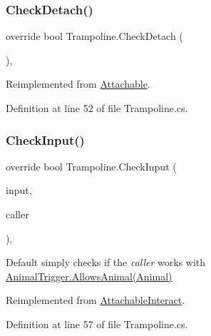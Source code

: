 \subsubsection{\texorpdfstring{Check\+Detach()}{CheckDetach()}}
{\footnotesize\ttfamily override bool Trampoline.\+Check\+Detach (\begin{DoxyParamCaption}{ }\end{DoxyParamCaption})\hspace{0.3cm}{\ttfamily [protected]}, {\ttfamily [virtual]}}



Reimplemented from \mbox{\hyperlink{class_attachable_a5cd6ea1bf16c527c033e6f09681f84f8}{Attachable}}.



Definition at line 52 of file Trampoline.\+cs.

\mbox{\label{class_trampoline_a7cd4dba8195da3407019ef918daa1280}} 
\subsubsection{\texorpdfstring{Check\+Input()}{CheckInput()}}
{\footnotesize\ttfamily override bool Trampoline.\+Check\+Input (\begin{DoxyParamCaption}\item[{Input\+Control}]{input,  }\item[{\mbox{\hyperlink{class_animal}{Animal}}}]{caller }\end{DoxyParamCaption})\hspace{0.3cm}{\ttfamily [protected]}, {\ttfamily [virtual]}}



Default simply checks if the {\itshape caller}  works with \mbox{\hyperlink{class_animal_trigger_ae8394dfcf5f91b8c413959a4d6baa3a9}{Animal\+Trigger.\+Allows\+Animal(\+Animal)}} 



Reimplemented from \mbox{\hyperlink{class_attachable_interact_a7efc3c845dc5112e6c744eee254094e6}{Attachable\+Interact}}.



Definition at line 57 of file Trampoline.\+cs.

\mbox{\label{class_trampoline_a37c1ae11b89a61be854133cfa1628572}} 
